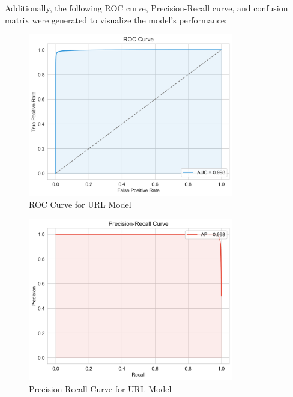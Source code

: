 \documentclass{article}
\begin{document}
\noindent
Additionally, the following ROC curve, Precision-Recall curve, and confusion matrix were generated to visualize the model's performance:


\begin{figure}[htbp]
    \centering
    \includegraphics[width=0.8\textwidth]{../analysis/url/roc_curve.png}
    \caption{ROC Curve for URL Model}
    \label{fig:roc_curve_1}
\end{figure}

\begin{figure}[htbp]
    \centering
    \includegraphics[width=0.8\textwidth]{../analysis/url/precision_recall_curve.png}
    \caption{Precision-Recall Curve for URL Model}
    \label{fig:precision_recall_curve_1}
\end{figure}
\end{document}

